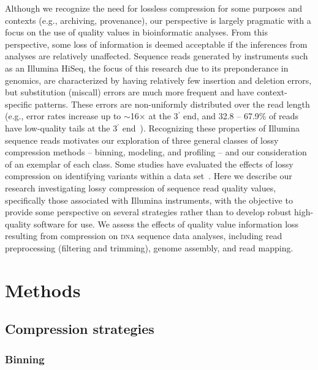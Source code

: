 \documentclass{bmcart}
\begin{document}
Although we recognize the need for lossless compression for some
purposes and contexts (e.g., archiving, provenance), our perspective
is largely pragmatic with a focus on the use of quality values in
bioinformatic analyses. From this perspective, some loss of
information is deemed acceptable if the inferences from analyses are
relatively unaffected. Sequence reads generated by instruments such as
an Illumina HiSeq, the focus of this research due to its preponderance
in genomics, are characterized by having relatively few insertion and
deletion errors, but substitution (miscall) errors are much more
frequent and have context-specific patterns. These errors are
non-uniformly distributed over the read length (e.g., error rates
increase up to $\sim$16$\times$ at the 3$^{\prime}$ end, and 32.8 --
67.9\% of reads have low-quality tails at the 3$^{\prime}$
end~\cite{Minoche:2011km}). Recognizing these properties of Illumina
sequence reads motivates our exploration of three general classes of
lossy compression methods -- binning, modeling, and profiling -- and
our consideration of an exemplar of each class. Some studies have
evaluated the effects of lossy compression on identifying variants
within a data set~\cite{Canovas:2014fr,janin2013adaptive}. Here we
describe our research investigating lossy compression of sequence read
quality values, specifically those associated with Illumina
instruments, with the objective to provide some perspective on several
strategies rather than to develop robust high-quality software for
use. We assess the effects of quality value information loss resulting
from compression on \textsc{dna} sequence data analyses, including
read preprocessing (filtering and trimming), genome assembly, and read
mapping.

\section*{Methods}

\subsection*{Compression strategies}

\subsubsection*{Binning}
\end{document}
